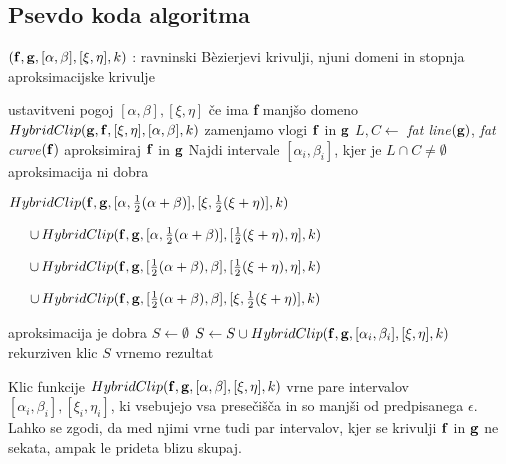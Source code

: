 
\subsection{Psevdo koda algoritma}\text{}
\smallskip
\begin{small}
   \begin{algorithmic}[1]
	\Require $({\bf f},{\bf g}, [\alpha,\beta], [\xi,\eta], k)$ : ravninski B\`{e}zierjevi krivulji, njuni domeni in stopnja aproksimacijske krivulje

	 \hfill ustavitveni pogoj
		\State \Return $[\alpha,\beta],[\xi,\eta]$
	\Else
		\If{$|\alpha - \beta | < |\xi - \eta|$} \hfill če ima {\bf f} manjšo domeno
			\State $HybridClip( {\bf g}, {\bf f}, [\xi,\eta],[\alpha,\beta],k)$ 
			\hfill zamenjamo vlogi ${\bf f}$ in ${\bf g}$
		\Else
			\State $L, C \gets $ {\em fat line}$({\bf g})$, {\em fat curve}$({\bf f})$ 
			\hfill aproksimiraj ${\bf f}$ in ${\bf g}$
			\State Najdi intervale $[\alpha _i,\beta _i]$, kjer je $L\cap C\neq \emptyset$
			 \hfill  aproksimacija ni dobra
				\State \Return \begin{varwidth}[t]{\linewidth}  
					$HybridClip({\bf f},{\bf g},[\alpha,\frac{1}{2}(\alpha+\beta)],[\xi,\frac{1}{2}(\xi+\eta)],k)$\par $ 
        \hskip\algorithmicindent
					\cup \, HybridClip({\bf f},{\bf g},[\alpha,\frac{1}{2}(\alpha+\beta)],[\frac{1}{2}(\xi+\eta), \eta],k)$\par$
        \hskip\algorithmicindent
					\cup \, HybridClip({\bf f},{\bf g},[\frac{1}{2}(\alpha+\beta), \beta],[\frac{1}{2}(\xi+\eta), \eta],k)$\par$
        \hskip\algorithmicindent
					\cup \, HybridClip({\bf f},{\bf g},[\frac{1}{2}(\alpha+\beta), \beta],[\xi, \frac{1}{2}(\xi+\eta)],k)$
					\end{varwidth}
			\Else \hfill  aproksimacija je dobra
				\State $S\gets \emptyset$
					\State $S\gets S\cup HybridClip({\bf f},{\bf g},[\alpha _i,\beta _i], [\xi,\eta],k)$
					\hfill rekurziven klic
				\EndFor
				\State \Return $S$ \hfill vrnemo rezultat
			\EndIf
		\EndIf
	\EndIf
   \end{algorithmic}
\end{small}
\smallskip

Klic funkcije $HybridClip({\bf f},{\bf g}, [\alpha,\beta],[\xi,\eta],k)$ vrne pare intervalov $[\alpha_i,\beta_i], [\xi_i,\eta_i]$, ki vsebujejo vsa presečišča in so manjši od predpisanega $\epsilon$. Lahko se zgodi, da med njimi vrne tudi par intervalov, kjer se krivulji ${\bf f }$ in ${\bf g}$ ne sekata, ampak le prideta blizu skupaj.
